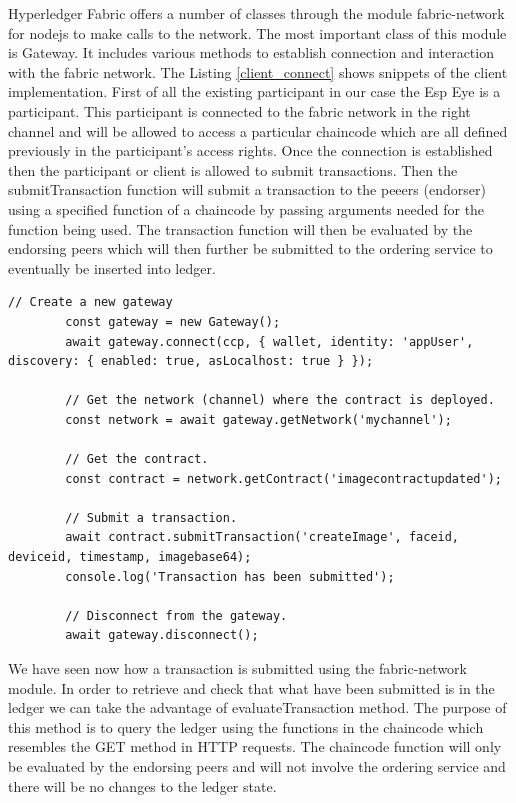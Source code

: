 Hyperledger Fabric offers a number of classes through the module {\selectfont fabric-network} for nodejs to make calls to the network. The most important class of this module is {\selectfont Gateway}. It includes various methods to establish connection and interaction with the fabric network. The Listing \ref{client_connect} shows snippets of the client implementation. First of all the existing participant in our case the Esp Eye is a participant. This participant is connected to the fabric network in the right channel and will be allowed to access a particular chaincode which are all defined previously in the participant's access rights. Once the connection is established then the participant or client is allowed to submit transactions. Then the {\selectfont submitTransaction} function will submit a transaction to the peeers (endorser) using a specified function of a chaincode by passing arguments needed for the function being used.  The transaction function will then be evaluated by the endorsing peers which will then further be submitted to the ordering service to eventually be inserted into ledger. 


\begin{lstlisting}[caption={Client establishing the connection and submitting a transaction.},label=client_connect, captionpos=b]
        // Create a new gateway 
        const gateway = new Gateway();
        await gateway.connect(ccp, { wallet, identity: 'appUser', discovery: { enabled: true, asLocalhost: true } });

        // Get the network (channel) where the contract is deployed.
        const network = await gateway.getNetwork('mychannel');

        // Get the contract.
        const contract = network.getContract('imagecontractupdated');

        // Submit a transaction.
        await contract.submitTransaction('createImage', faceid, deviceid, timestamp, imagebase64);
        console.log('Transaction has been submitted');

        // Disconnect from the gateway.
        await gateway.disconnect();
\end{lstlisting}

We have seen now how a transaction is submitted using the {\selectfont fabric-network} module. In order to retrieve and check that what have been submitted is in the ledger we can take the advantage of {\selectfont evaluateTransaction} method. The purpose of this method is to query the ledger using the functions in the chaincode which resembles the GET method in HTTP requests. The chaincode function will only be evaluated by the endorsing peers and will not involve the ordering service and there will be no changes to the ledger state. 

